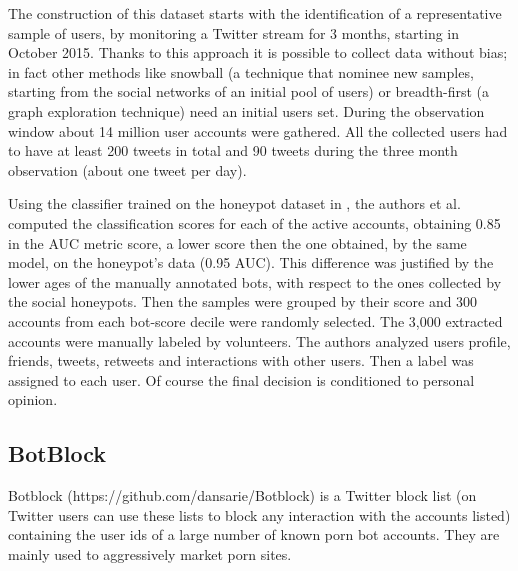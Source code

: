 The construction of this dataset starts with the identification of a representative sample of users, by monitoring a Twitter stream for 3 months, starting in October 2015. Thanks to this approach it is possible to collect data without bias; in fact other methods like snowball (a technique that nominee new samples, starting from the social networks of an initial pool of users) or breadth-first (a graph exploration technique) need an initial users set.
During the observation window about 14 million user accounts were gathered. 
All the collected users had to have at least 200 tweets in total and 90 tweets during the three month observation (about one tweet per day).

Using the classifier trained on the honeypot dataset in \cite{Lee11sevenmonths}, the authors et al. \cite{Varol} computed the classification scores for each of the active accounts, obtaining 0.85 in the AUC metric score, a lower score then the one obtained, by the same model, on the honeypot's data (0.95 AUC). This difference was justified by the lower ages of the manually annotated bots, with respect to the ones collected by the social honeypots.
Then the samples were grouped by their score and 300 accounts from each bot-score decile were randomly selected. 
The 3,000 extracted accounts were manually labeled by volunteers. The authors analyzed users profile, friends, tweets, retweets and interactions with other users. Then a label was assigned to each user.
Of course the final decision is conditioned to personal opinion.

\subsection{BotBlock}
Botblock (https://github.com/dansarie/Botblock) is a Twitter block list (on Twitter users can use these lists to block any interaction with the accounts listed) containing the user ids of a large number of known porn bot accounts. 
They are mainly used to aggressively market porn sites.

